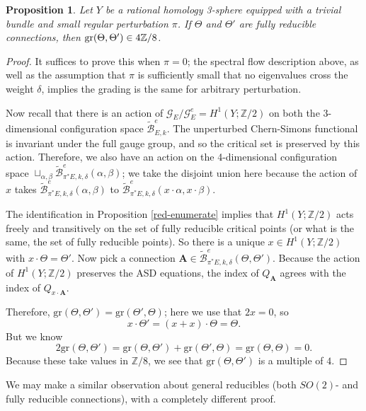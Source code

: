 \documentclass{memo-l}
\newcommand{\pE}{\pi^* \! E}
\newtheorem{proposition}[theorem]{Proposition}
\theoremstyle{definition}
\theoremstyle{remark}
\numberwithin{section}{chapter}
\numberwithin{equation}{chapter}
\begin{document}
\begin{proposition}\label{gr-fullred}Let $Y$ be a rational homology 3-sphere equipped with a trivial bundle and small regular perturbation $\pi$. If $\Theta$ and $\Theta'$ are fully reducible connections, then $\textup{gr}(\Theta, \Theta') \in 4\mathbb Z/8$.
\end{proposition}
\begin{proof}It suffices to prove this when $\pi = 0$; the spectral flow description above, as well as the assumption that $\pi$ is sufficiently small that no eigenvalues cross the weight $\delta$, implies the grading is the same for arbitrary perturbation.

Now recall that there is an action of $\mathcal G_E/\mathcal G^e_E = H^1(Y;\mathbb Z/2)$ on both the 3-dimensional configuration space $\widetilde{\mathcal B}^e_{E,k}$. The unperturbed Chern-Simons functional is invariant under the full gauge group, and so the critical set is preserved by this action. Therefore, we also have an action on the 4-dimensional configuration space $\sqcup_{\alpha, \beta}\widetilde{\mathcal B}^e_{\pE,k,\delta}(\alpha,\beta)$; we take the disjoint union here because the action of $x$ takes $\widetilde{\mathcal B}^e_{\pE,k,\delta}(\alpha,\beta)$ to $\widetilde{\mathcal B}^e_{\pE,k,\delta}(x \cdot \alpha,x \cdot \beta)$.

The identification in Proposition \ref{red-enumerate} implies that $H^1(Y;\mathbb Z/2)$ acts freely and transitively on the set of fully reducible critical points (or what is the same, the set of fully reducible points). So there is a unique $x \in H^1(Y;\mathbb Z/2)$ with $x \cdot \Theta = \Theta'$. Now pick a connection $\mathbf{A} \in \widetilde{\mathcal B}^e_{\pE, k,\delta}(\Theta, \Theta')$. Because the action of $H^1(Y;\mathbb Z/2)$ preserves the ASD equations, the index of $Q_\mathbf{A}$ agrees with the index of $Q_{x \cdot \mathbf{A}}$.

Therefore, $\text{gr}(\Theta, \Theta') = \text{gr}(\Theta', \Theta)$; here we use that $2x = 0$, so 
$$x \cdot \Theta' = (x + x) \cdot \Theta = \Theta.$$ 
But we know $$2\text{gr}(\Theta, \Theta') = \text{gr}(\Theta, \Theta') + \text{gr}(\Theta', \Theta) = \text{gr}(\Theta, \Theta) = 0.$$ Because these take values in $\mathbb Z/8$, we see that $\text{gr}(\Theta, \Theta')$ is a multiple of $4$.
\end{proof}

We may make a similar observation about general reducibles (both $SO(2)$- and fully reducible connections), with a completely different proof.
\end{document}
